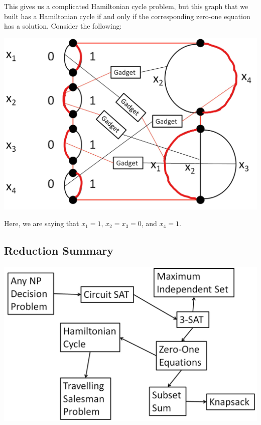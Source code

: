 \documentclass[letterpaper]{article}
\begin{document}
This gives us a complicated Hamiltonian cycle problem, but this graph that we built has a Hamiltonian cycle if and only if the corresponding zero-one equation has a solution. Consider the following: 
\begin{center}
    \includegraphics[scale=0.3]{../assets/zoe_ham_13.png}
\end{center}
Here, we are saying that $x_1 = 1$, $x_2 = x_3 = 0$, and $x_4 = 1$. 

\subsection{Reduction Summary}
\begin{center}
    \includegraphics[scale=0.3]{../assets/reduction_summary.png}
\end{center}
\end{document}
